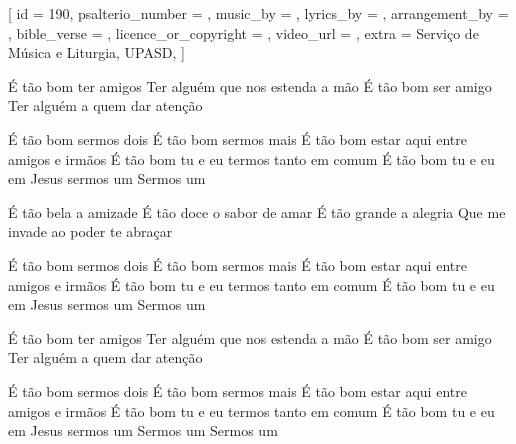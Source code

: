 [
    id                     = {190},
    psalterio_number       = {},
    music_by               = {},
    lyrics_by              = {},
    arrangement_by         = {},
    bible_verse            = {},
    licence_or_copyright   = {},
    video_url              = {},
    extra                  = {Serviço de Música e Liturgia, UPASD},
]


\beginverse
É tão bom ter amigos
Ter alguém que nos estenda a mão
É tão bom ser amigo
Ter alguém a quem dar atenção
\endverse


\beginchorus
É tão bom sermos dois
É tão bom sermos mais
É tão bom estar aqui entre amigos e irmãos
É tão bom tu e eu termos tanto em comum
É tão bom tu e eu em Jesus sermos um
Sermos um
\endchorus




\beginverse
É tão bela a amizade
É tão doce o sabor de amar
É tão grande a alegria
Que me invade ao poder te abraçar
\endverse


\beginchorus
É tão bom sermos dois
É tão bom sermos mais
É tão bom estar aqui entre amigos e irmãos
É tão bom tu e eu termos tanto em comum
É tão bom tu e eu em Jesus sermos um
Sermos um
\endchorus


\beginverse
É tão bom ter amigos
Ter alguém que nos estenda a mão
É tão bom ser amigo
Ter alguém a quem dar atenção
\endverse


\beginchorus
É tão bom sermos dois
É tão bom sermos mais
É tão bom estar aqui entre amigos e irmãos
É tão bom tu e eu termos tanto em comum
É tão bom tu e eu em Jesus sermos um
Sermos um
Sermos um
\endchorus
\endsong
